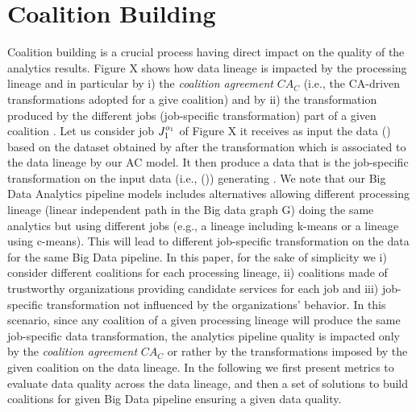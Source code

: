 \section{Coalition Building}\label{sec:coalition}
Coalition building is a crucial process having direct impact on the quality of the analytics results. %
Figure X shows how data lineage is impacted by the processing lineage and in particular by i) the \textit{coalition agreement} $\textit{CA}_C$ (i.e., the CA-driven transformations adopted for a give coalition) and by ii) the transformation produced by the different jobs (job-specific transformation) part of a given coalition \coalition{}.
Let us consider job $J_{1}^{o_{1}}$ of %
Figure X it receives as input the data () based on the dataset obtained by  after the transformation   which is associated to the data lineage by our AC model. It then produce a data that is the job-specific transformation on the input data (i.e., ()) generating .
We note that our Big Data Analytics pipeline models includes alternatives allowing different processing lineage (linear independent path in the Big data graph G) doing the same analytics but using different jobs (e.g., a lineage including k-means or a lineage using c-means). This will lead to different job-specific transformation on the data for the same Big Data pipeline.
In this paper, for the sake of simplicity we i) consider different coalitions for each processing lineage, ii) coalitions made of trustworthy organizations  providing candidate services for each job and iii) job-specific transformation not influenced by the organizations' behavior.
In this scenario, since any coalition of a given processing lineage will produce the same job-specific data transformation, the analytics pipeline quality is impacted only by the \textit{coalition agreement} $\textit{CA}_C$ or rather by the transformations  imposed by the given coalition \coalition{} on the data lineage.
In the following we first present metrics to evaluate data quality across the data lineage, and then a set of solutions to build coalitions for  given Big Data pipeline ensuring a given data quality.

